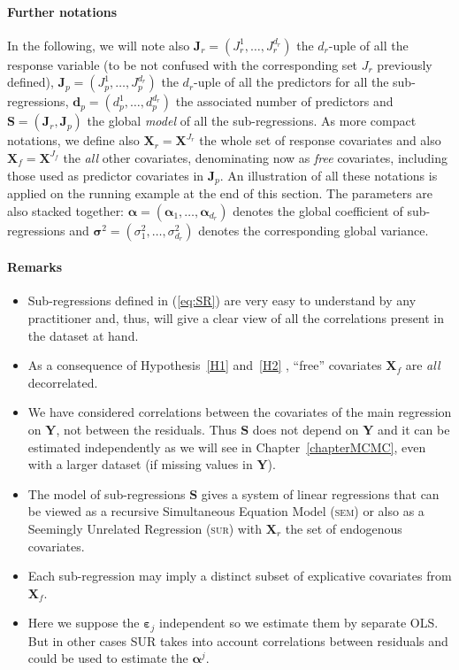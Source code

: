 \documentclass[12pt,a4paper]{report}
\begin{document}
\paragraph{Further notations} In the following, we will note also $\boldsymbol{J}_r=(J_{r}^1,\ldots,J_r^{d_r})$ the $d_r$-uple of all the response variable (to be not confused with the corresponding set $J_r$ previously defined), $\boldsymbol{J}_p=(J_{p}^1,\ldots,J_p^{d_r})$ the $d_r$-uple of all the predictors for all the sub-regressions, $\boldsymbol{d}_p=(d_p^1,\ldots,d_p^{d_{r}})$ the associated number of predictors and $\boldsymbol{S}=(\boldsymbol{J}_r,\boldsymbol{J}_p)$ the global {\it model} of all the sub-regressions. As more compact notations, we define also $\boldsymbol{X}_r=\boldsymbol{X}^{J_{r}}$ the whole set of response covariates and also $\boldsymbol{X}_f=\boldsymbol{X}^{J_{f}}$ the {\it all} other covariates, denominating now as {\it free} covariates, including those used as predictor covariates in $\boldsymbol{J}_p$. An illustration of all these notations is applied on the running example at the end of this section. The parameters are also stacked together: $\boldsymbol{\alpha}=(\boldsymbol{\alpha}_1,\ldots,\boldsymbol{\alpha}_{d_r})$ denotes the global coefficient of sub-regressions and $\boldsymbol{\sigma}^2=(\sigma^2_1,\ldots,\sigma^2_{d_r})$ denotes the corresponding global variance.

\paragraph{Remarks}
\begin{itemize}
\item Sub-regressions defined in (\ref{eq:SR}) are very easy to understand by any practitioner and, thus, will give a clear view of all the correlations present in the dataset at hand.
\item As a consequence of Hypothesis~\ref{H1} and~\ref{H2} , ``free'' covariates $\boldsymbol{X}_f$ are {\it all} decorrelated.
\item We have considered correlations between the covariates of the main regression on $\boldsymbol{Y}$, not between the residuals. Thus $\boldsymbol{S}$ does not depend on $\boldsymbol{Y}$ and it can be estimated independently as we will see in Chapter~\ref{chapterMCMC}, even with a larger dataset (if missing values in $\boldsymbol{Y}$).
\item The model of sub-regressions $\boldsymbol{S}$ gives a system of linear regressions that can be viewed as a recursive Simultaneous Equation Model (\textsc{sem})\cite{davidson1993estimation,TIMM} or also as a Seemingly Unrelated Regression (\textsc{sur}) \cite{SURzellner} with $\boldsymbol{X}_r$ the set of endogenous covariates.
\item Each sub-regression may imply a distinct subset of explicative covariates from $\boldsymbol{X}_f$.
\item Here we suppose the $\boldsymbol{\varepsilon}_j$ independent so we estimate them by separate OLS. But in other cases \textsc{SUR} takes into account correlations between residuals and could be used to estimate the $\boldsymbol{\alpha}^j$. 
\end{itemize} 
\end{document}
